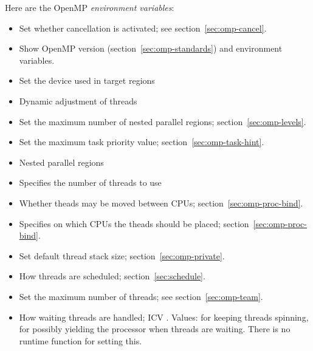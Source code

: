 Here are the OpenMP \emph{environment variables}:
\begin{itemize}
\item {} Set whether cancellation is activated;
  see section~\ref{sec:omp-cancel}.
\item {} Show OpenMP version (section~\ref{sec:omp-standards})
  and environment variables.
\item {} Set the device used in target regions
\item {} Dynamic adjustment of threads
\item {} Set the maximum number of nested parallel
  regions; section~\ref{sec:omp-levels}.
\item {} Set the maximum task priority value;
  section~\ref{sec:omp-task-hint}.
\item {} Nested parallel regions
\item {} Specifies the number of threads to use
\item {} Whether theads may be moved between CPUs;
  section~\ref{sec:omp-proc-bind}.
\item {} Specifies on which CPUs the theads should be placed;
  section~\ref{sec:omp-proc-bind}.
\item {} Set default thread stack size;
  section~\ref{sec:omp-private}.
\item {} How threads are scheduled;
  section~\ref{sec:schedule}.
\item {} Set the maximum number of threads;
  see section~\ref{sec:omp-team}.
\item {} How waiting threads are
  handled; \ac{ICV} . Values:
   for keeping threads spinning,  for possibly
  yielding the processor when threads are waiting.
  There is no runtime function for setting this.
\end{itemize}

